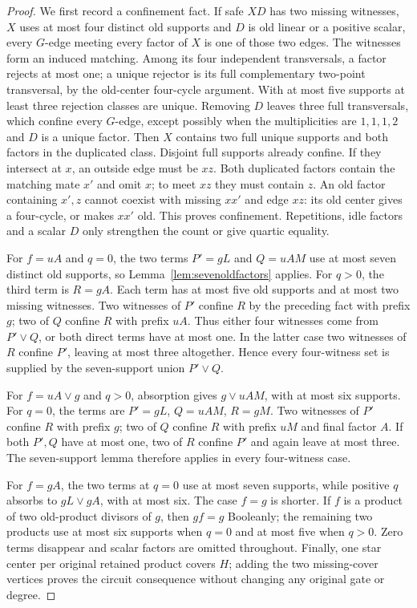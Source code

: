 \documentclass[11pt]{article}
\theoremstyle{definition}
\theoremstyle{remark}
\begin{document}
\begin{proof}
We first record a confinement fact. If safe $XD$ has two missing witnesses, $X$ uses at most four distinct old supports and $D$ is old linear or a positive scalar, every $G$-edge meeting every factor of $X$ is one of those two edges. The witnesses form an induced matching. Among its four independent transversals, a factor rejects at most one; a unique rejector is its full complementary two-point transversal, by the old-center four-cycle argument. With at most five supports at least three rejection classes are unique. Removing $D$ leaves three full transversals, which confine every $G$-edge, except possibly when the multiplicities are $1,1,1,2$ and $D$ is a unique factor. Then $X$ contains two full unique supports and both factors in the duplicated class. Disjoint full supports already confine. If they intersect at $x$, an outside edge must be $xz$. Both duplicated factors contain the matching mate $x'$ and omit $x$; to meet $xz$ they must contain $z$. An old factor containing $x',z$ cannot coexist with missing $xx'$ and edge $xz$: its old center gives a four-cycle, or makes $xx'$ old. This proves confinement. Repetitions, idle factors and a scalar $D$ only strengthen the count or give quartic equality.

For $f=uA$ and $q=0$, the two terms $P'=gL$ and $Q=uAM$ use at most seven distinct old supports, so Lemma~\ref{lem:sevenoldfactors} applies. For $q>0$, the third term is $R=gA$. Each term has at most five old supports and at most two missing witnesses. Two witnesses of $P'$ confine $R$ by the preceding fact with prefix $g$; two of $Q$ confine $R$ with prefix $uA$. Thus either four witnesses come from $P'\vee Q$, or both direct terms have at most one. In the latter case two witnesses of $R$ confine $P'$, leaving at most three altogether. Hence every four-witness set is supplied by the seven-support union $P'\vee Q$.

For $f=uA\vee g$ and $q>0$, absorption gives $g\vee uAM$, with at most six supports. For $q=0$, the terms are $P'=gL$, $Q=uAM$, $R=gM$. Two witnesses of $P'$ confine $R$ with prefix $g$; two of $Q$ confine $R$ with prefix $uM$ and final factor $A$. If both $P',Q$ have at most one, two of $R$ confine $P'$ and again leave at most three. The seven-support lemma therefore applies in every four-witness case.

For $f=gA$, the two terms at $q=0$ use at most seven supports, while positive $q$ absorbs to $gL\vee gA$, with at most six. The case $f=g$ is shorter. If $f$ is a product of two old-product divisors of $g$, then $gf=g$ Booleanly; the remaining two products use at most six supports when $q=0$ and at most five when $q>0$. Zero terms disappear and scalar factors are omitted throughout. Finally, one star center per original retained product covers $H$; adding the two missing-cover vertices proves the circuit consequence without changing any original gate or degree.
\end{proof}
\end{document}
